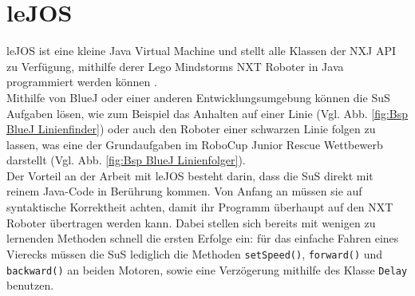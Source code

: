 \documentclass[paper=a4, pagesize, DIV=calc, BCOR=12.5mm, twoside=on, onecolumn=on, open = any, titlepage =on, parskip =half-, headsepline = on, footsepline = on, chapterprefix = on, appendixprefix = off, fontsize = 12pt, numbers = noenddot, abstract = on]{scrbook}
\numberwithin{equation}{chapter}
\theoremstyle{definition}
\theoremstyle{plain}
\theoremstyle{plain}
\theoremstyle{remark}
\theoremstyle{plain}
\theoremstyle{plain}
\begin{document}
\par \singlespacing
\section{leJOS}
\label{sec:lejos}
\onehalfspacing
leJOS ist eine kleine Java Virtual Machine und stellt alle Klassen der NXJ API zu Verfügung, mithilfe derer Lego Mindstorms NXT Roboter in Java programmiert werden können \cite{lejos}.\\
Mithilfe von BlueJ oder einer anderen Entwicklungsumgebung können die SuS Aufgaben lösen, wie zum Beispiel das Anhalten auf einer Linie (Vgl. Abb. \ref{fig:Bsp BlueJ Linienfinder}) oder auch den Roboter einer schwarzen Linie folgen zu lassen, was eine der Grundaufgaben im RoboCup Junior Rescue Wettbewerb darstellt (Vgl. Abb. \ref{fig:Bsp BlueJ Linienfolger}).\\
Der Vorteil an der Arbeit mit leJOS besteht darin, dass die SuS direkt mit reinem Java-Code in Berührung kommen. Von Anfang an müssen sie auf syntaktische Korrektheit achten, damit ihr Programm überhaupt auf den NXT Roboter übertragen werden kann. Dabei stellen sich bereits mit wenigen zu lernenden Methoden schnell die ersten Erfolge ein: für das einfache Fahren eines Vierecks müssen die SuS lediglich die  Methoden \texttt{setSpeed()}, \texttt{forward()} und \texttt{backward()} an beiden Motoren, sowie eine Verzögerung mithilfe des Klasse \texttt{Delay} benutzen. 


\par \singlespacing
\end{document}
